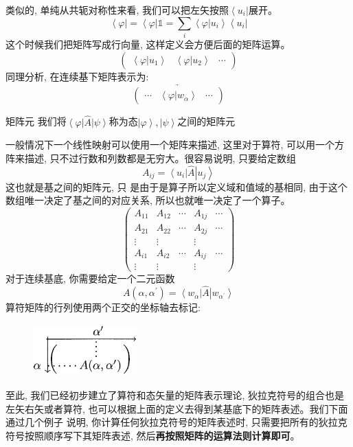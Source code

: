类似的, 单纯从共轭对称性来看, 我们可以把左矢按照${\left\langle u_i\right|}$展开。
\[\left\langle\varphi\right|=\left\langle\varphi\right|\mathbb{1}=\sum\limits_{i}\left\langle\varphi| u_i\right\rangle\left\langle u_i \right| \]
这个时候我们把矩阵写成行向量, 这样定义会方便后面的矩阵运算。
\begin{equation*}
    \begin{pmatrix}
        \left \langle \varphi  | u_1 \right \rangle& \left \langle \varphi  | u_2 \right \rangle &\cdots
    \end{pmatrix} 
\end{equation*}
同理分析, 在连续基下矩阵表示为:
\begin{equation*}
    \underrightarrow{
        \begin{pmatrix}
        \cdots& \left \langle \varphi  | w_\alpha  \right \rangle &\cdots
        \end{pmatrix} 
    }
\end{equation*}
\begin{define}{矩阵元}
    我们将$\left \langle \varphi  \right |\hat A\left| \psi  \right \rangle $称为态$\left | \varphi  \right \rangle ,\left | \psi  \right \rangle $之间的矩阵元
\end{define}
一般情况下一个线性映射可以使用一个矩阵来描述, 这里对于算符, 可以用一个方阵来描述, 只不过行数和列数都是无穷大。很容易说明, 只要给定数组\[A_{ij}=\left \langle u_i  \right |\hat A\left| u_j  \right \rangle \]这也就是基之间的矩阵元, 只
是由于是算子所以定义域和值域的基相同, 由于这个数组唯一决定了基之间的对应关系, 所以也就唯一决定了一个算子。
\begin{equation*}
    \left(\begin{array}{ccccc}
        A_{11} & A_{12} & \cdots & A_{1 j} & \cdots \\
        A_{21} & A_{22} & \cdots & A_{2 j} & \cdots \\
        \vdots & \vdots & & \vdots & \\
        A_{i 1} & A_{i 2} & \cdots & A_{i j} & \cdots \\
        \vdots & \vdots & & \vdots &
        \end{array}\right)
\end{equation*}
对于连续基底, 你需要给定一个二元函数\[A\left(\alpha,\alpha^\prime\right)=\left \langle w_\alpha \right |\hat A\left| w_{\alpha^\prime}  \right \rangle \]
算符矩阵的行列使用两个正交的坐标轴去标记:
\begin{figure}[htbp]
    \centering
    \includegraphics[width=4cm,height=2cm]{fig/b-2.eps}
\end{figure}
\newpage
至此, 我们已经初步建立了算符和态矢量的矩阵表示理论, 狄拉克符号的组合也是左矢右矢或者算符, 也可以根据上面的定义去得到某基底下的矩阵表述。我们下面通过几个例子
说明, 你计算任何狄拉克符号的矩阵表述时, 只需要把所有的狄拉克符号按照顺序写下其矩阵表述, 然后\textbf{再按照矩阵的运算法则计算即可}。

